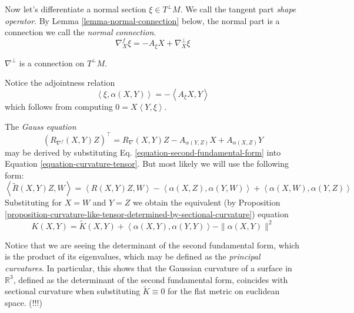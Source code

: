 \medskip\noindent

Now let's differentiate a normal section $\xi\in T^\perp M$. 
We call the tangent part {\it shape operator}. By Lemma
\ref{lemma-normal-connection} below, the normal part is a connection 
we call the {\it normal connection}.
\begin{equation}
\label{equation-shape-operator}
\nabla^f_X\xi=-A_\xi X+\nabla^\perp_X\xi
\end{equation}
\begin{lemma}
\label{lemma-normal-connection}
$\nabla^\perp$ is a connection on $T^\perp M$.
\end{lemma}
Notice the adjointness relation
\begin{equation}
\label{equation-second-fundamental-form-and-shape-operator}
\left<\xi,\alpha(X,Y)\right>=-\left<A_\xi X,Y\right>
\end{equation}
which follows from computing $0=X\left<Y,\xi\right>$.

The {\it Gauss equation}
$$
(R_{\nabla^f}(X,Y)Z)^\top=R_\nabla(X,Y)Z-A_{\alpha(Y,Z)}X+A_{\alpha(X,Z)}Y
$$
may be derived by substituting Eq. \ref{equation-second-fundamental-form} 
into Equation \ref{equation-curvature-tensor}. But most likely we will use the
following form:
\begin{equation}
\label{equation-Gauss}
\left<\tilde{R}(X,Y)Z,W\right>=\left<R(X,Y)Z,W\right>
-\left<\alpha(X,Z),\alpha(Y,W)\right>+\left<\alpha(X,W),\alpha(Y,Z)\right>
\end{equation}
Substituting for $X=W$ and $Y=Z$ we obtain the equivalent (by Proposition
\ref{proposition-curvature-like-tensor-determined-by-sectional-curvature}) 
equation 
\begin{equation}
\label{equation-Gauss-sectional-curvature}
K(X,Y)=\tilde{K}(X,Y)+\left<\alpha(X,Y),\alpha(Y,Y)\right>-\|\alpha(X,Y)\|^2
\end{equation}

Notice that we are seeing the determinant of the second fundamental form, which
is the product of its eigenvalues, which may be defined as the {\it principal
curvatures}. In particular, this shows that the Gaussian curvature of a surface 
in $\mathbb{R}^3$, defined as the determinant of the second fundamental form, 
coincides with sectional curvature when substituting $\tilde{K}\equiv0$ for
 the flat metric on euclidean space. (!!!)

